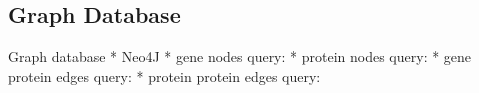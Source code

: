 \subsection{Graph Database} \label{subsec:graph_database}


{\color{lightgray}
Graph database
    * Neo4J
    * gene nodes query:
    * protein nodes query:
    * gene protein edges query:
    * protein protein edges query:

}